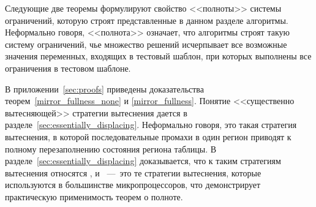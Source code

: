 Следующие две теоремы формулируют свойство <<полноты>> системы ограничений, которую строят представленные в данном разделе алгоритмы. Неформально говоря, <<полнота>> означает, что алгоритмы строят такую систему ограничений, чье множество решений исчерпывает все возможные значения переменных, входящих в тестовый шаблон, при которых выполнены все ограничения в тестовом шаблоне.

\begin{theorem}\label{mirror_fullness_none}
\FullnessMirrorNone
\end{theorem}

\begin{theorem}\label{mirror_fullness}
\FullnessMirror
\end{theorem}

В приложении~\ref{sec:proofs} приведены доказательства теорем~\ref{mirror_fullness_none} и \ref{mirror_fullness}. Понятие <<существенно вытесняющей>> стратегии вытеснения дается в разделе~\ref{sec:essentially_displacing}. Неформально говоря, это такая стратегия вытеснения, в которой последовательные промахи в один регион приводят к полному перезаполнению состояния региона таблицы. В разделе~\ref{sec:essentially_displacing} доказывается, что к таким стратегиям вытеснения относятся \LRU, \FIFO и \PseudoLRU~---~это те стратегии вытеснения, которые используются в большинстве микропроцессоров, что демонстрирует практическую применимость теорем о полноте.


